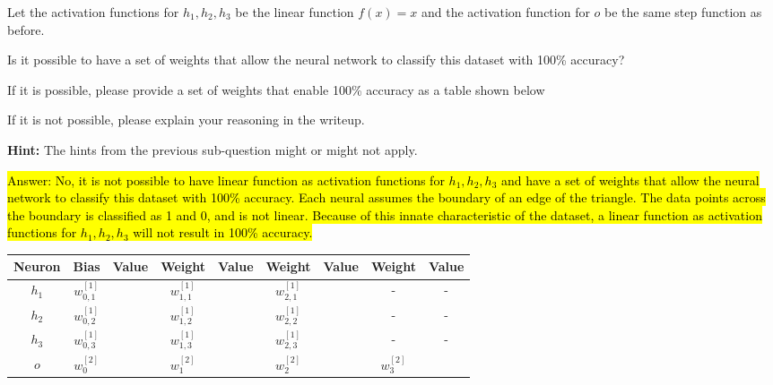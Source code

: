 \item {} Let the activation functions for $h_1, h_2, h_3$ be the linear function $f(x) = x$ and the activation function for $o$ be the same step function as before.


Is it possible to have a set of weights that allow the neural network to classify this dataset with 100\% accuracy?

If it is possible, please provide a set of weights that enable 100\% accuracy as a table shown below

If it is not possible, please explain your reasoning in the writeup.

\textbf{Hint:} The hints from the previous sub-question might or might not apply.

\hl{Answer: No, it is not possible to have linear function as activation functions for $h_1, h_2, h_3$ and have a set of weights
that allow the neural network to classify this dataset with 100\% accuracy. Each neural assumes the boundary of an edge of the triangle. The data points across the boundary is classified as 1 and 0, and is not linear. Because of this innate characteristic of the dataset, a linear function as activation functions for $h_1, h_2, h_3$ will not result in 100\% accuracy.}

\begin{table}[h]
\centering
\begin{tabular}{ |c||c|c||c|c||c|c||c|c|}
\hline
Neuron & Bias & Value &  Weight & Value & Weight & Value & Weight & Value\\
\hline
$h_1$ & $w_{0,1}^{[1]}$ &  & $w_{1,1}^{[1]}$ &  & $w_{2,1}^{[1]}$ &   & - & -\\
\hline
$h_2$ & $w_{0,2}^{[1]}$ &  & $w_{1,2}^{[1]}$ &  & $w_{2,2}^{[1]}$ &   & - & -\\
\hline
$h_3$ & $w_{0,3}^{[1]}$ &  & $w_{1,3}^{[1]}$ &  & $w_{2,3}^{[1]}$ &   & - & - \\
\hline
$o$ & $w_{0}^{[2]}$ &  & $w_{1}^{[2]}$ &  & $w_{2}^{[2]}$ &  & $w_{3}^{[2]}$ &  \\
\hline
\end{tabular}
\end{table}